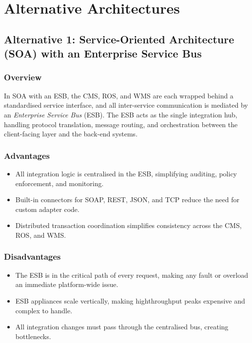 \section{Alternative Architectures}


\subsection{Alternative 1: Service-Oriented Architecture (SOA) with an Enterprise Service Bus}

\subsubsection{Overview}

In SOA with an ESB, the CMS, ROS, and WMS are each wrapped behind a standardised service interface, and all inter-service communication is mediated by an \textit{Enterprise Service Bus} (ESB). The ESB acts as the single integration hub, handling protocol translation, message routing, and orchestration between the client-facing layer and the back-end systems.

\subsubsection{Advantages}

\begin{itemize}
    \item All integration logic is centralised in the ESB, simplifying auditing, policy enforcement, and monitoring.
    \item Built-in connectors for SOAP, REST, JSON, and TCP reduce the need for custom adapter code.
    \item Distributed transaction coordination simplifies consistency across the CMS, ROS, and WMS.
\end{itemize}

\subsubsection{Disadvantages}

\begin{itemize}
    \item The ESB is in the critical path of every request, making any fault or overload an immediate platform-wide issue.
    \item ESB appliances scale vertically, making highthroughput peaks expensive and complex to handle.
    \item All integration changes must pass through the centralised bus, creating bottlenecks.
\end{itemize}

